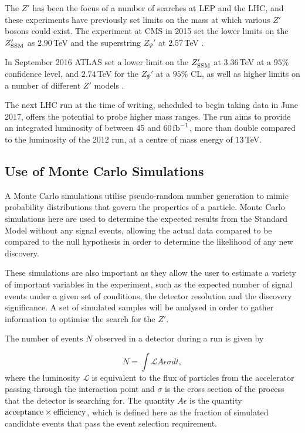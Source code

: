\documentclass{article}
\begin{document}
The $Z'$ has been the focus of a number of searches at LEP and the LHC, and these experiments have previously set limits on the mass at which various $Z'$ bosons could exist. The experiment at CMS in 2015 set the lower limits on the $Z_{\rm{SSM}}'$ as $2.90\,$TeV and the superstring $Z_{\Psi}'$ at $2.57\,$TeV \cite{CMSDileptonSearch}. 

In September 2016 ATLAS set a lower limit on the $Z_{\rm{SSM}}'$ at $3.36\,$TeV at a $95\%$ confidence level, and $2.74\,$TeV for the $Z_{\Psi}'$ at a $95\%$ CL, as well as higher limits on a number of different $Z'$ models \cite{ATLAS2016ZPrime}.

The next LHC run at the time of writing, scheduled to begin taking data in June 2017, offers the potential to probe higher mass ranges. The run aims to provide an integrated luminosity of between 45 and 60$\,\rm{fb}^{-1}$, more than double compared to the luminosity of the 2012 run, at a centre of mass energy of $13\,$TeV.




\subsection{Use of Monte Carlo Simulations}%
\label{sec:study_MCS}


A Monte Carlo simulations utilise pseudo-random number generation to mimic probability distributions that govern the properties of a particle. Monte Carlo simulations here are used to determine the expected results from the Standard Model without any signal events, allowing the actual data compared to be compared to the null hypothesis in order to determine the likelihood of any new discovery.

These simulations are also important as they allow the user to estimate a variety of important variables in the experiment, such as the expected number of signal events under a given set of conditions, the detector resolution and the discovery significance. A set of simulated samples will be analysed in order to gather information to optimise the search for the $Z'$. 

The number of events $N$ observed in a detector during a run is given by

\begin{equation}
N = \int \mathcal{L}A\epsilon\sigma dt ,
\end{equation}
where the luminosity $\mathcal{L}$ is equivalent to the flux of particles from the accelerator passing through the interaction point and $\sigma$ is the cross section of the process that the detector is searching for. The quantity $A\epsilon$ is the quantity $\rm{acceptance} \times \rm{efficiency}$, which is defined here as the fraction of simulated candidate events that pass the event selection requirement.
\end{document}
